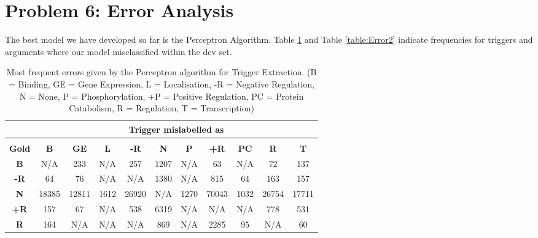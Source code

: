 \documentclass{article} %
\begin{document}
\section*{Problem 6: Error Analysis}

The best model we have developed so far is the Perceptron Algorithm. Table \ref{table:Error1} and Table \ref{table:Error2} indicate frequencies for triggers and arguments where our model misclassified within the dev set. 

\begin{table}[!htbp]
    \caption{Most frequent errors given by the Perceptron algorithm for Trigger Extraction. (B = Binding, GE = Gene Expression, L = Localisation, -R = Negative Regulation, N = None, P = Phosphorylation, +P = Positive Regulation, PC = Protein Catabolism, R = Regulation, T = Transcription)}
    \label{table:Error1}
\begin{center}
\begin{tabular}{c c c c c c c c c c c}
\multicolumn{1}{c}{} & \multicolumn{10}{c}{\bf Trigger mislabelled as}
\\ \hline \\
\textbf{Gold}  & \textbf{B} & \textbf{GE} & \textbf{L} & \textbf{-R} & \textbf{N} & \textbf{P} & \textbf{+R} & \textbf{PC} & \textbf{R} & \textbf{T}\\
\textbf{B}  & N/A & 233 & N/A & 257 & 1207 & N/A & 63 & N/A & 72 & 137\\
\textbf{-R} & 64 & 76 & N/A & N/A & 1380 & N/A & 815 & 64 & 163 & 157\\
\textbf{N}  & 18385 & 12811 & 1612 & 26920 & N/A & 1270 & 70043 & 1032 & 26754 & 17711\\
\textbf{+R} & 157 & 67 & N/A & 538 & 6319 & N/A & N/A & N/A & 778 & 531\\
\textbf{R}  & 164 & N/A & N/A & N/A & 869 & N/A & 2285 & 95 & N/A & 60\\

\end{tabular}
\end{center}
\end{table}
\end{document}
